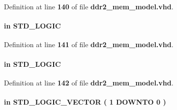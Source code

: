 Definition at line {\bf 140} of file {\bf ddr2\+\_\+mem\+\_\+model.\+vhd}.

\paragraph[{mem\+\_\+clk\+\_\+n}]{ {\bfseries \textcolor{keywordflow}{in}\textcolor{vhdlchar}{ }} {\bfseries \textcolor{comment}{S\+T\+D\+\_\+\+L\+O\+G\+IC}\textcolor{vhdlchar}{ }} \hspace{0.3cm}{\ttfamily [Port]}}\label{classddr2__mem__model_a478e9651ef2ecd2d56ca3082222b0333}


Definition at line {\bf 141} of file {\bf ddr2\+\_\+mem\+\_\+model.\+vhd}.

\paragraph[{mem\+\_\+cs\+\_\+n}]{ {\bfseries \textcolor{keywordflow}{in}\textcolor{vhdlchar}{ }} {\bfseries \textcolor{comment}{S\+T\+D\+\_\+\+L\+O\+G\+IC}\textcolor{vhdlchar}{ }} \hspace{0.3cm}{\ttfamily [Port]}}\label{classddr2__mem__model_a96326a55708ede127b79ae66cb698fd2}


Definition at line {\bf 142} of file {\bf ddr2\+\_\+mem\+\_\+model.\+vhd}.

\paragraph[{mem\+\_\+dm}]{ {\bfseries \textcolor{keywordflow}{in}\textcolor{vhdlchar}{ }} {\bfseries \textcolor{comment}{S\+T\+D\+\_\+\+L\+O\+G\+I\+C\+\_\+\+V\+E\+C\+T\+OR}\textcolor{vhdlchar}{ }\textcolor{vhdlchar}{(}\textcolor{vhdlchar}{ }\textcolor{vhdlchar}{ } \textcolor{vhdldigit}{1} \textcolor{vhdlchar}{ }\textcolor{keywordflow}{D\+O\+W\+N\+TO}\textcolor{vhdlchar}{ }\textcolor{vhdlchar}{ } \textcolor{vhdldigit}{0} \textcolor{vhdlchar}{ }\textcolor{vhdlchar}{)}\textcolor{vhdlchar}{ }} \hspace{0.3cm}{\ttfamily [Port]}}\label{classddr2__mem__model_a40521ddfe4aedeca7833cd7c7be16c34}



